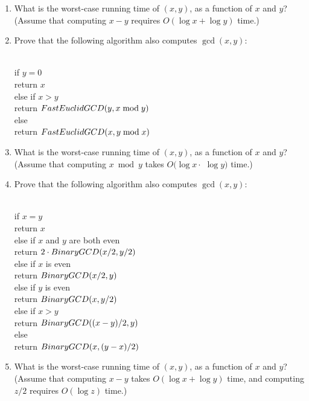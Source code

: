 \begin{exercises}
\begin{enumerate}[label=\arabic*.,ref=\thechapter.\arabic*,leftmargin=*,align=left,itemsep=1.5ex plus 0.5ex,resume]
\begin{enumerate}
\begin{enumerate}[label=\roman*.]
\item Prove that $(x, y)$ divides both $x$ and $y$.
\item Prove that every divisor of $x$ and $y$ is a divisor of $(x, y)$.
\end{enumerate}
\item What is the worst-case running time of $(x, y)$, as a function of $x$ and $y$? (Assume that computing $x - y$ requires $O(\log x + \log y)$ time.)
\item Prove that the following algorithm also computes $\gcd(x, y)$:
\begin{pseudocode}
\\
if $y = 0$\\
\Indent return $x$\\
else if $x > y$\\
\Indent return $FastEuclidGCD(y, x \bmod y)$\\
else\\
\Indent return $FastEuclidGCD(x, y \bmod x)$
\end{pseudocode}
\item What is the worst-case running time of $(x, y)$, as a function of $x$ and $y$? (Assume that computing $x \bmod y$ takes $O(\log x \cdot$ $\log y)$ time.)
\item Prove that the following algorithm also computes $\gcd(x, y)$:
\begin{pseudocode}
\\
if $x = y$\\
\Indent return $x$\\
else if $x$ and $y$ are both even\\
\Indent return $2 \cdot BinaryGCD(x/2, y/2)$\\
else if $x$ is even\\
\Indent return $BinaryGCD(x/2, y)$\\
else if $y$ is even\\
\Indent return $BinaryGCD(x, y/2)$\\
else if $x > y$\\
\Indent return $BinaryGCD((x-y)/2, y)$\\
else\\
\Indent return $BinaryGCD(x, (y-x)/2)$
\end{pseudocode}
\item What is the worst-case running time of $(x, y)$, as a function of $x$ and $y$? (Assume that computing $x - y$ takes $O(\log x + \log y)$ time, and computing $z/2$ requires $O(\log z)$ time.)
\end{enumerate}
\end{enumerate}


\end{exercises}
